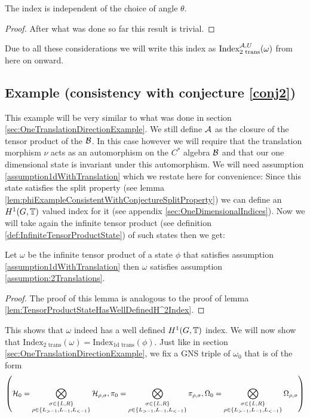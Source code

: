 \documentclass[12pt,a4paper,twoside]{article}
\numberwithin{equation}{section}
\begin{document}
\begin{lemma}
	The index is independent of the choice of angle $\theta$.
\end{lemma}
\begin{proof}
	After what was done so far this result is trivial.
\end{proof}
Due to all these considerations we will write this index as $\textrm{Index}_{2\text{ trans}}^{\AA,U}(\omega)$ from here on onward.
\subsection{Example (consistency with conjecture \ref{conj2})}\label{sec:TwoTranslationDirectionsExample}
This example will be very similar to what was done in section \ref{sec:OneTranslationDirectionExample}. We still define $\AA$ as the closure of the tensor product of the $\BB$. In this case however we will require that the translation morphism $\nu$ acts as an automorphism on the $C^*$ algebra $\BB$ and that our one dimensional state is invariant under this automorphism. We will need assumption \ref{assumption1dWithTranslation} which we restate here for convenience:
\assumptionOneDimensionalTwo*
Since this state satisfies the split property (see lemma \ref{lem:phiExampleConsistentWithConjectureSplitProperty}) we can define an $H^1(G,\TT)$ valued index for it (see appendix \ref{sec:OneDimensionalIndices}). Now we will take again the infinite tensor product (see definition \ref{def:InfiniteTensorProductState}) of such states then we get:
\begin{lemma}
	Let $\omega$ be the infinite tensor product of a state $\phi$ that satisfies assumption \ref{assumption1dWithTranslation} then $\omega$ satisfies assumption \ref{assumption:2Translations}.
\end{lemma}
\begin{proof}
	The proof of this lemma is analogous to the proof of lemma \ref{lem:TensorProductStateHasWellDefinedH^2Index}.
\end{proof}
This shows that $\omega$ indeed has a well defined $H^1(G,\TT)$ index. We will now show that $\textrm{Index}_{\text{2 trans}}(\omega)=\textrm{Index}_{\text{1d trans}}(\phi)$. Just like in section \ref{sec:OneTranslationDirectionExample}, we fix a GNS triple of $\omega_0$ that is of the form
\begin{equation}
	\left(\HH_0=\bigotimes_{\substack{\sigma\in\{L,R\}\\ \rho\in\{L_{>-1},L_{-1},L_{<-1}\}}}\HH_{\rho,\sigma},\pi_0=\bigotimes_{\substack{\sigma\in\{L,R\}\\ \rho\in\{L_{>-1},L_{-1},L_{<-1}\}}}\pi_{\rho,\sigma},\Omega_0=\bigotimes_{\substack{\sigma\in\{L,R\}\\ \rho\in\{L_{>-1},L_{-1},L_{<-1}\}}}\Omega_{\rho,\sigma}\right)
\end{equation}
\end{document}
